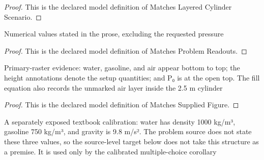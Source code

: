 \begin{proof}
  This is the declared model definition of Matches Layered Cylinder Scenario.
\end{proof}
\begin{definition}
  \label{def:physics:phyx-mini-0385:phyxminiproblems-problemphyxmini0385-matchesproblemreadouts}
  Numerical values stated in the prose, excluding the requested pressure
\end{definition}
\begin{proof}
  This is the declared model definition of Matches Problem Readouts.
\end{proof}
\begin{definition}
  \label{def:physics:phyx-mini-0385:phyxminiproblems-problemphyxmini0385-matchessuppliedfigure}
  Primary-raster evidence: water, gasoline, and air appear bottom to top; the height annotations denote the setup quantities; and P₀ is at the open top. The fill equation also records the unmarked air layer inside the 2.5 m cylinder
\end{definition}
\begin{proof}
  This is the declared model definition of Matches Supplied Figure.
\end{proof}
\begin{definition}
  \label{def:physics:phyx-mini-0385:phyxminiproblems-problemphyxmini0385-usesstandarddensityandgravitycalibration}
  A separately exposed textbook calibration: water has density 1000 kg/m³, gasoline 750 kg/m³, and gravity is 9.8 m/s². The problem source does not state these three values, so the source-level target below does not take this structure as a premise. It is used only by the calibrated multiple-choice corollary
\end{definition}
